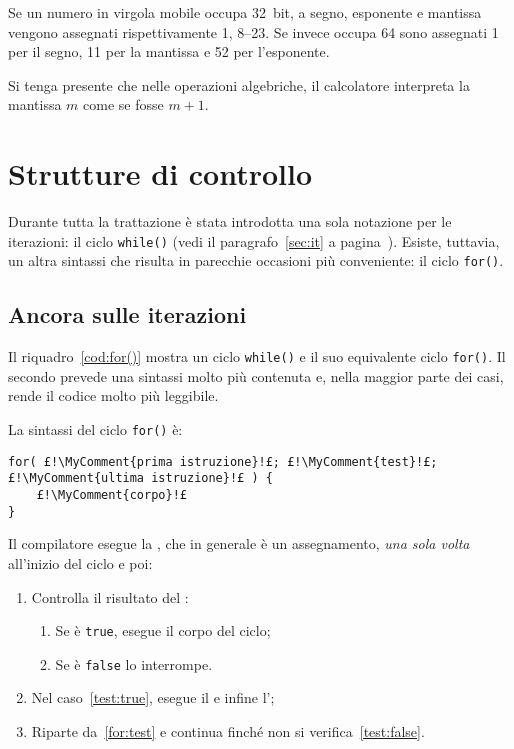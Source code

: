 Se un numero in virgola mobile occupa \SI{32}{bit}, a segno, esponente e mantissa vengono assegnati rispettivamente \SI{1}{\bit}, \SIrange[range-phrase={ e }]{8}{23}{\bit}.
Se invece occupa \SI{64}{\bit} sono assegnati \SI{1}{\bit} per il segno, \SI{11}{\bit} per la mantissa e \SI{52}{\bit} per l'esponente.

Si tenga presente che nelle operazioni algebriche, il calcolatore interpreta la mantissa $m$ come se fosse $m+1$.

	\section{Strutture di controllo}
Durante  tutta la trattazione è stata introdotta una sola notazione per le iterazioni: il ciclo \lstinline!while()! (vedi il paragrafo~\ref{sec:it} a pagina~\pageref{sec:it}).
Esiste, tuttavia, un altra sintassi che risulta in parecchie occasioni più conveniente: il ciclo \lstinline!for()!.

		\subsection{Ancora sulle iterazioni}

Il riquadro~\ref{cod:for()} mostra un ciclo \lstinline!while()! e il suo equivalente ciclo \lstinline!for()!.
Il secondo prevede una sintassi molto più contenuta e, nella maggior parte dei casi, rende il codice molto più leggibile.



La sintassi del ciclo \lstinline!for()! è:
\begin{lstlisting}
for( £!\MyComment{prima istruzione}!£; £!\MyComment{test}!£; £!\MyComment{ultima istruzione}!£ ) {
	£!\MyComment{corpo}!£
}
\end{lstlisting}

Il compilatore esegue la , che in generale è un assegnamento, \emph{una sola volta} all'inizio del ciclo e poi:
\begin{enumerate}
	\item\label{for:test}
Controlla il risultato del :
	\begin{enumerate}
		\item\label{test:true}
Se è \lstinline!true!, esegue il corpo del ciclo;
		\item\label{test:false}
 Se è \lstinline!false! lo interrompe.
\end{enumerate}
	\item
Nel caso~\ref{test:true}, esegue il  e infine l';
	\item
Riparte da~\ref{for:test} e continua finché non si verifica~\ref{test:false}.
\end{enumerate}

